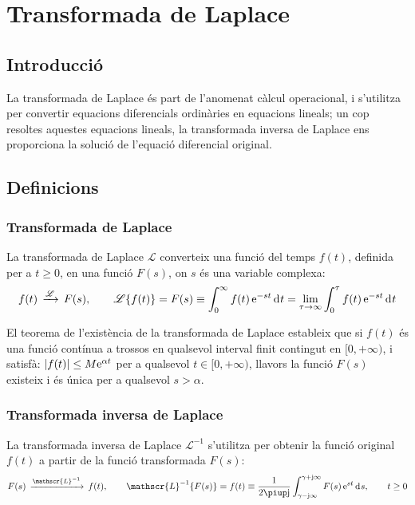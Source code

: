 \chapter{Transformada de Laplace}\label{sec:ch-laplace}

\section{Introducció}
La transformada de Laplace és part de l'anomenat càlcul operacional,
i s'utilitza per convertir equacions diferencials ordinàries en
equacions lineals; un cop resoltes aquestes equacions lineals, la
transformada inversa de Laplace ens proporciona la solució de
l'equació diferencial original.

\section{Definicions}

\subsection{Transformada de Laplace}

La transformada de Laplace $\mathscr{L}$  converteix una funció del
temps $f(t)$, definida per a $t\geq 0$, en una funció $F(s)$, on $s$
és una variable complexa:
\begin{equation}
	f(t)\,\xrightarrow{\mathscr{L}}\,F(s), \qquad
    \mathscr{L}\{f(t)\} = F(s) \equiv \int_0^\infty f(t) \,\eu^{-s t} \diff t =
    \lim_{\tau\to\infty} \int_0^\tau f(t) \,\eu^{-s t} \diff t \label{eq:transf_laplace}
\end{equation}

El teorema de l'existència de la transformada de Laplace estableix
que si $f(t)$ és una funció contínua a trossos en qualsevol
interval finit contingut en $[0,+\infty)$, i satisfà: $|f(t)| \leq M
\mathrm{e}^{\alpha t}$ per a qualsevol $t \in [0,+\infty)$, llavors la
funció $F(s)$ existeix i és única per a
qualsevol $s > \alpha$.

\subsection{Transformada inversa de Laplace}

La transformada inversa de Laplace $\mathscr{L}^{-1}$ s'utilitza per
obtenir la funció original $f(t)$ a partir de la funció
transformada $F(s)$:
\begin{equation}
	F(s)\,\xrightarrow{\mathscr{L}^{-1}}\,f(t), \qquad
    \mathscr{L}^{-1}\{F(s)\} = f(t) \equiv \frac{1}{2 \piup \ju }
    \int_{\gamma-\ju \infty}^{\gamma+\ju \infty} F(s)\, \eu^{s t} \diff s,
    \qquad t\geq 0 \label{eq:transf_inv_laplace}
\end{equation}

